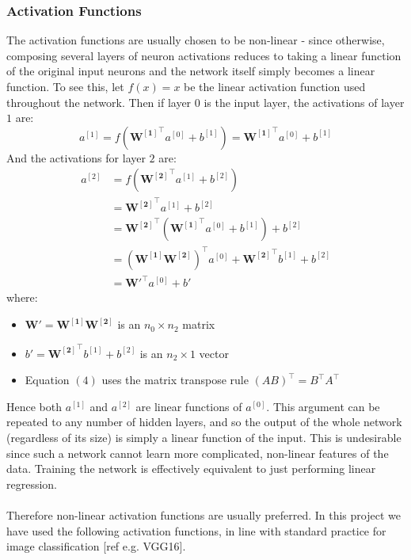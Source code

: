 \documentclass[11pt]{article} %
\theoremstyle{plain}
\theoremstyle{definition}
\begin{document}
\subsubsection{Activation Functions}
The activation functions are usually chosen to be non-linear - since otherwise, composing several layers of neuron activations reduces to taking a linear function of the original input neurons and the network itself simply becomes a linear function. To see this, let \(f(x) = x\) be the linear activation function used throughout the network. Then if layer \(0\) is the input layer, the activations of layer \(1\) are:
\[a^{[1]} = f(\mathbf{{W^{[1]}}^{\top}}a^{[0]} + b^{[1]}) = \mathbf{{W^{[1]}}^{\top}}a^{[0]} + b^{[1]}\]
And the activations for layer \(2\) are:
\begin{align}
a^{[2]} &= f(\mathbf{{W^{[2]}}^{\top}}a^{[1]} + b^{[2]})  \\
      &= \mathbf{{W^{[2]}}^{\top}}a^{[1]} + b^{[2]} \\
      &= \mathbf{{W^{[2]}}^{\top}}(\mathbf{{W^{[1]}}^{\top}}a^{[0]} + b^{[1]}) + b^{[2]} \\
      &= \mathbf{(W^{[1]}W^{[2]})^{\top}}a^{[0]} + \mathbf{{W^{[2]}}^{\top}}b^{[1]} + b^{[2]} \\
      &= \mathbf{W'^{\top}}a^{[0]} + b' 
\end{align}
where:
\begin{itemize}
  \item \(\mathbf{W'} = \mathbf{W^{[1]}W^{[2]}}\)  is an \({n_0}\times{n_2}\) matrix
  \item \(b' = \mathbf{{W^{[2]}}^{\top}}b^{[1]} + b^{[2]}\) is an \({n_2}\times{1}\) vector
  \item Equation \((4)\) uses the matrix transpose rule \((AB)^{\top} = B^{\top}A^{\top}\)
\end{itemize}
Hence both \(a^{[1]}\) and \(a^{[2]}\) are linear functions of \(a^{[0]}\). This argument can be repeated to any number of hidden layers, and so the output of the whole network (regardless of its size) is simply a linear function of the input. This is undesirable since such a network cannot learn more complicated, non-linear features of the data. Training the network is effectively equivalent to just performing linear regression.
\\
\\
\noindent
Therefore non-linear activation functions are usually preferred. In this project we have used the following activation functions, in line with standard practice for image classification [ref e.g. VGG16].
\end{document}
